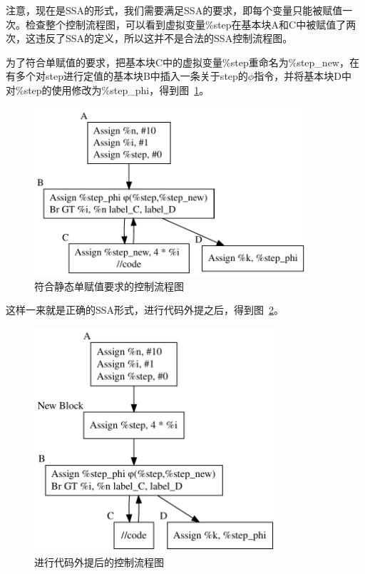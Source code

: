 注意，现在是SSA的形式，我们需要满足SSA的要求，即每个变量只能被赋值一次。检查整个控制流程图，可以看到虚拟变量\%step在基本块A和C中被赋值了两次，这违反了SSA的定义，所以这并不是合法的SSA控制流程图。

为了符合单赋值的要求，把基本块C中的虚拟变量\%step重命名为\%step\_new，在有多个对step进行定值的基本块B中插入一条关于step的$\phi$指令，并将基本块D中对\%step的使用修改为\%step\_phi，得到图~\ref{fig:motion1}。

\begin{figure}[htb]
  \centering
  \includegraphics[width=0.9\textwidth]{figures/codeMotion_phi.pdf}
  \caption{符合静态单赋值要求的控制流程图}
  \label{fig:motion1}
\end{figure}

这样一来就是正确的SSA形式，进行代码外提之后，得到图~\ref{fig:motion2}。

\begin{figure}[htb]
  \centering
  \includegraphics[width=0.8\textwidth]{figures/post_codeMotion.pdf}
  \caption{进行代码外提后的控制流程图}
  \label{fig:motion2}
\end{figure}

